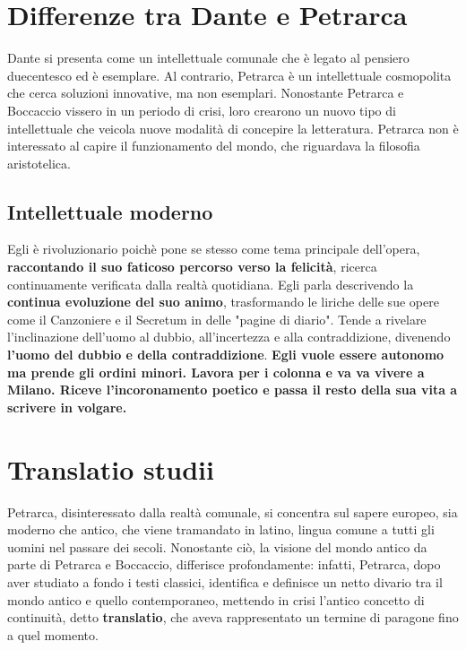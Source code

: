 \documentclass[10pt,a4paper]{article}
\begin{document}
\section{Differenze tra Dante e Petrarca}

Dante si presenta come un intellettuale comunale che è legato al pensiero duecentesco ed è esemplare. Al contrario, Petrarca è un intellettuale cosmopolita che cerca soluzioni innovative, ma non esemplari. Nonostante Petrarca e Boccaccio vissero in un periodo di crisi, loro crearono un nuovo tipo di intellettuale che veicola nuove modalità di concepire la letteratura. Petrarca non è interessato al capire il funzionamento del mondo, che riguardava la filosofia aristotelica.

\subsection{Intellettuale moderno}

Egli è rivoluzionario poichè pone se stesso come tema principale dell'opera, \textbf{raccontando il suo faticoso percorso verso la felicità}, ricerca continuamente verificata dalla realtà quotidiana.
Egli parla descrivendo la \textbf{continua evoluzione del suo animo}, trasformando le liriche delle sue opere come il Canzoniere e il Secretum in delle "pagine di diario". 
Tende a rivelare l'inclinazione dell'uomo al dubbio, all'incertezza e alla contraddizione, divenendo \textbf{l'uomo del dubbio e della contraddizione}. \textbf{Egli vuole essere autonomo ma prende gli ordini minori. Lavora per i colonna e va va vivere a Milano. Riceve l'incoronamento poetico e passa il resto della sua vita a scrivere in volgare.}

\section{Translatio studii}

Petrarca, disinteressato dalla realtà comunale, si concentra sul sapere europeo, sia moderno che antico, che viene tramandato in latino, lingua comune a tutti gli uomini nel passare dei secoli. Nonostante ciò, la visione del mondo antico da parte di Petrarca e Boccaccio, differisce profondamente: infatti, Petrarca, dopo aver studiato a fondo i testi classici, identifica e definisce un netto divario tra il mondo antico e quello contemporaneo, mettendo in crisi l'antico concetto di continuità, detto \textbf{translatio}, che aveva rappresentato un termine di paragone fino a quel momento. 
\end{document}
